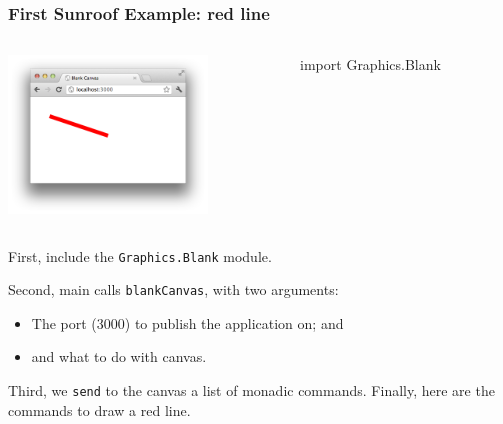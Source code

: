 \documentclass{beamer}
\begin{document}
\begin{frame}[fragile]
\frametitle{First Sunroof Example: red line}
\Large



\begin{columns}
\begin{column}{0.40\textwidth}
\includegraphics[width=150pt]{red-line.png}
\end{column}
\begin{column}{0.60\textwidth}
\begin{codeblock}[0.95]
\footnotesize
\begin{semiverbatim}
import Graphics.Blank
\end{semiverbatim}
\end{codeblock}
\end{column}
\end{columns}

\frameskip{}
%
{First, include the {\tt Graphics.Blank} module.\vspace{0.58in}}
%
{Second, main calls {\tt blankCanvas}, with two arguments:%
\begin{itemize}
\item The port (3000) to publish the application on; and
\item and what to do with canvas.
\end{itemize}
}
%
{Third, we {\tt send} to the canvas a list of monadic commands.\vspace{0.38in}}
%
{Finally, here are the commands to draw a {\color{red}red} line.\vspace{0.58in}}

\end{frame}
\end{document}
